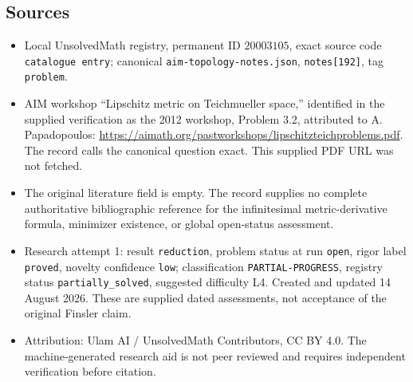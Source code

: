 \documentclass[11pt]{article}
\begin{document}
\subsection{Sources}
\begin{itemize}
\item Local UnsolvedMath registry, permanent ID \(20003105\), exact source code \texttt{catalogue entry}; canonical \texttt{aim-topology-notes.json}, \texttt{notes[192]}, tag \texttt{problem}.
\item AIM workshop ``Lipschitz metric on Teichmueller space,'' identified in the supplied verification as the 2012 workshop, Problem 3.2, attributed to A. Papadopoulos: \url{https://aimath.org/pastworkshops/lipschitzteichproblems.pdf}. The record calls the canonical question exact. This supplied PDF URL was not fetched.
\item The original literature field is empty. The record supplies no complete authoritative bibliographic reference for the infinitesimal metric-derivative formula, minimizer existence, or global open-status assessment.
\item Research attempt 1: result \texttt{reduction}, problem status at run \texttt{open}, rigor label \texttt{proved}, novelty confidence \texttt{low}; classification \texttt{PARTIAL-PROGRESS}, registry status \texttt{partially\_solved}, suggested difficulty L4. Created and updated 14 August 2026. These are supplied dated assessments, not acceptance of the original Finsler claim.
\item Attribution: Ulam AI / UnsolvedMath Contributors, CC BY 4.0. The machine-generated research aid is not peer reviewed and requires independent verification before citation.
\end{itemize}
\end{document}
